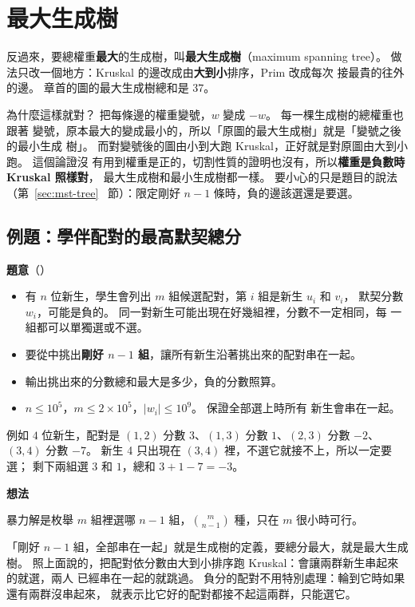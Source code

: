 \section{最大生成樹}
\label{sec:max-st}

反過來，要總權重\textbf{最大}的生成樹，叫\textbf{最大生成樹}（maximum spanning
tree）。 做法只改一個地方：Kruskal 的邊改成由\textbf{大到小}排序，Prim 改成每次
接最貴的往外的邊。 章首的圖的最大生成樹總和是 $37$。

為什麼這樣就對？ 把每條邊的權重變號，$w$ 變成 $-w$。 每一棵生成樹的總權重也跟著
變號，原本最大的變成最小的，所以「原圖的最大生成樹」就是「變號之後的最小生成
樹」。 而對變號後的圖由小到大跑 Kruskal，正好就是對原圖由大到小跑。 這個論證沒
有用到權重是正的，切割性質的證明也沒有，所以\textbf{權重是負數時 Kruskal 照樣對}，
最大生成樹和最小生成樹都一樣。 要小心的只是題目的說法（第~\ref{sec:mst-tree}~
節）：限定剛好 $n - 1$ 條時，負的邊該選還是要選。

\subsection{例題：學伴配對的最高默契總分}
\label{sec:ex-buddy}

\textbf{題意}（）

\begin{itemize}
\item 有 $n$ 位新生，學生會列出 $m$ 組候選配對，第 $i$ 組是新生 $u_i$ 和 $v_i$，
默契分數 $w_i$，可能是負的。 同一對新生可能出現在好幾組裡，分數不一定相同，每
一組都可以單獨選或不選。
\item 要從中挑出\textbf{剛好 $n - 1$ 組}，讓所有新生沿著挑出來的配對串在一起。
\item 輸出挑出來的分數總和最大是多少，負的分數照算。
\item $n \le 10^5$，$m \le 2 \times 10^5$，$|w_i| \le 10^9$。 保證全部選上時所有
新生會串在一起。
\end{itemize}

例如 $4$ 位新生，配對是 $(1, 2)$ 分數 $3$、$(1, 3)$ 分數 $1$、$(2, 3)$ 分數 $-2$、
$(3, 4)$ 分數 $-7$。 新生 4 只出現在 $(3, 4)$ 裡，不選它就接不上，所以一定要選；
剩下兩組選 $3$ 和 $1$，總和 $3 + 1 - 7 = -3$。

\textbf{想法}

暴力解是枚舉 $m$ 組裡選哪 $n - 1$ 組，$\binom{m}{n - 1}$ 種，只在 $m$ 很小時可行。

「剛好 $n - 1$ 組，全部串在一起」就是生成樹的定義，要總分最大，就是最大生成樹。
照上面說的，把配對依分數由大到小排序跑 Kruskal：會讓兩群新生串起來的就選，兩人
已經串在一起的就跳過。 負分的配對不用特別處理：輪到它時如果還有兩群沒串起來，
就表示比它好的配對都接不起這兩群，只能選它。

